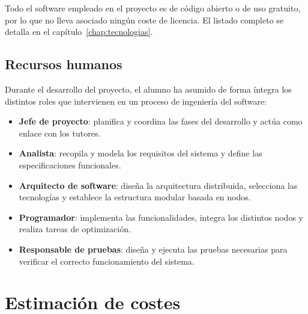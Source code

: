 Todo el software empleado en el proyecto es de código abierto o de uso gratuito, por lo que no lleva asociado ningún coste de licencia. El listado completo se detalla en el capítulo~\ref{chap:tecnologias}.

\subsection{Recursos humanos}

Durante el desarrollo del proyecto, el alumno ha asumido de forma íntegra los distintos roles que intervienen en un proceso de ingeniería del software:

\begin{itemize}
    \item \textbf{Jefe de proyecto}: planifica y coordina las fases del desarrollo y actúa como enlace con los tutores.
    \item \textbf{Analista}: recopila y modela los requisitos del sistema y define las especificaciones funcionales.
    \item \textbf{Arquitecto de software}: diseña la arquitectura distribuida, selecciona las tecnologías y establece la estructura modular basada en nodos.
    \item \textbf{Programador}: implementa las funcionalidades, integra los distintos nodos y realiza tareas de optimización.
    \item \textbf{Responsable de pruebas}: diseña y ejecuta las pruebas necesarias para verificar el correcto funcionamiento del sistema.
\end{itemize}

\section{Estimación de costes}
\label{sec:custos}

